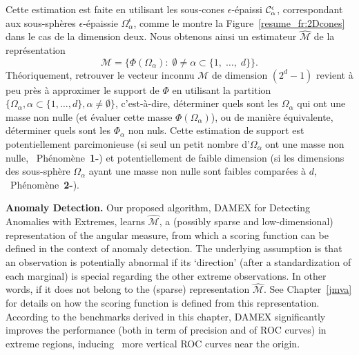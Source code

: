 Cette estimation est faite en utilisant les sous-cones $\epsilon$-épaissi $\mathcal{C}_\alpha^\epsilon$, correspondant aux sous-sphères $\epsilon$-épaissie $\Omega_\alpha^\epsilon$, comme le montre la Figure~\ref{resume_fr:2Dcones} dans le cas de la dimension deux.
Nous obtenons ainsi un estimateur $\widehat{\mathcal{M}}$ de la représentation
$$\mathcal{M} = \{ \Phi(\Omega_{\alpha}):\; \emptyset \neq \alpha\subset\{1,\; \ldots,\; d \}\}.$$
Théoriquement, retrouver le vecteur inconnu $\mathcal{M}$ de dimension $(2^{d}-1)$ revient à peu près à approximer le support de $\Phi$ en utilisant la partition
$\{\Omega_\alpha, \alpha\subset\{1,\ldots,d\}, \alpha\neq \emptyset\}$, c'est-à-dire, déterminer quels sont les $\Omega_\alpha$ qui ont
une masse non nulle (et évaluer cette masse $\Phi(\Omega_\alpha)$), ou de manière équivalente, déterminer quels sont les $\Phi_\alpha$ non nuls. Cette estimation de support est potentiellement parcimonieuse (si seul un petit nombre d'$\Omega_\alpha$ ont une masse non nulle, \ie~Phénomène~\textbf{1-}) et
potentiellement de faible dimension (si les dimensions des sous-sphère $\Omega_\alpha$ ayant une masse non nulle sont faibles comparées à $d$, \ie~Phénomène~\textbf{2-}).



\textbf{Anomaly Detection.}
Our proposed algorithm, DAMEX for Detecting Anomalies with Extremes, learns $\widehat{\mathcal{M}}$, a (possibly sparse and low-dimensional) representation of the angular measure, from which a scoring function can be defined in the context of anomaly detection.
The underlying assumption is that an observation is potentially abnormal if its `direction' (after a standardization of each marginal) is special regarding the other extreme observations. In other words, if it does not belong to the (sparse) representation $\widehat{\mathcal{M}}$. See Chapter~\ref{jmva} for details on how the scoring function is defined from this representation.
According to the benchmarks derived in this chapter, DAMEX significantly improves the performance (both in term of precision and of ROC curves) in extreme regions, inducing \eg~more vertical ROC curves near the origin.


